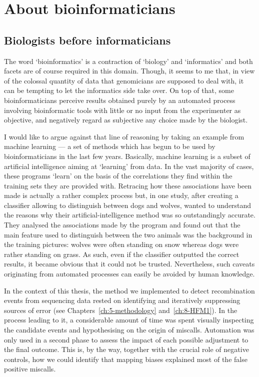 
\section{About bioinformaticians}

\subsection{Biologists before informaticians} 

The word ‘bioinformatics’ is a contraction of ‘biology’ and ‘informatics’ and both facets are of course required in this domain.
Though, it seems to me that, in view of the colossal quantity of data that genomicians are supposed to deal with, it can be tempting to let the informatics side take over.
On top of that, some bioinformaticians perceive results obtained purely by an automated process involving bioinformatic tools with little or no input from the experimenter as objective, and negatively regard as subjective any choice made by the biologist.

I would like to argue against that line of reasoning by taking an example from machine learning — a set of methods which has begun to be used by bioinformaticians in the last few years.
Basically, machine learning is a subset of artificial intelligence aiming at ‘learning’ from data.
In the vast majority of cases, these programs ‘learn’ on the basis of the correlations they find within the training sets they are provided with.
Retracing how these associations have been made is actually a rather complex process but, in one study, after creating a classifier allowing to distinguish between dogs and wolves, \citet{ribeiro2016why} wanted to understand the reasons why their artificial-intelligence method was so outstandingly accurate.
They analysed the associations made by the program and found out that the main feature used to distinguish between the two animals was the background in the training pictures: wolves were often standing on snow whereas dogs were rather standing on grass.
As such, even if the classifier outputted the correct results, it became obvious that it could not be trusted.
Nevertheless, such caveats originating from automated processes can easily be avoided by human knowledge.

In the context of this thesis, the method we implemented to detect recombination events from sequencing data rested on identifying and iteratively suppressing sources of error (see Chapters~\ref{ch:5-methodology} and~\ref{ch:8-HFM1}).
In the process leading to it, a considerable amount of time was spent visually inspecting the candidate events and hypothesising on the origin of miscalls.
Automation was only used in a second phase to assess the impact of each possible adjustment to the final outcome.
This is, by the way, together with the crucial role of negative controls, how we could identify that mapping biases explained most of the false positive miscalls.

